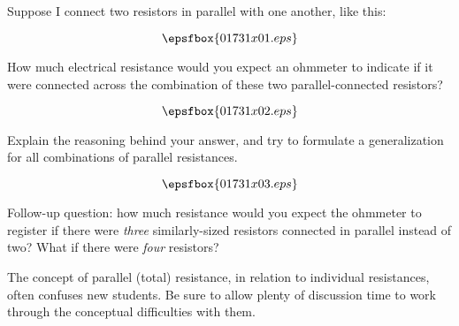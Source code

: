 

Suppose I connect two resistors in parallel with one another, like this:

$$\epsfbox{01731x01.eps}$$

How much electrical resistance would you expect an ohmmeter to indicate if it were connected across the combination of these two parallel-connected resistors?

$$\epsfbox{01731x02.eps}$$

Explain the reasoning behind your answer, and try to formulate a generalization for all combinations of parallel resistances.







$$\epsfbox{01731x03.eps}$$

Follow-up question: how much resistance would you expect the ohmmeter to register if there were {\it three} similarly-sized resistors connected in parallel instead of two?  What if there were {\it four} resistors?







The concept of parallel (total) resistance, in relation to individual resistances, often confuses new students.  Be sure to allow plenty of discussion time to work through the conceptual difficulties with them.




